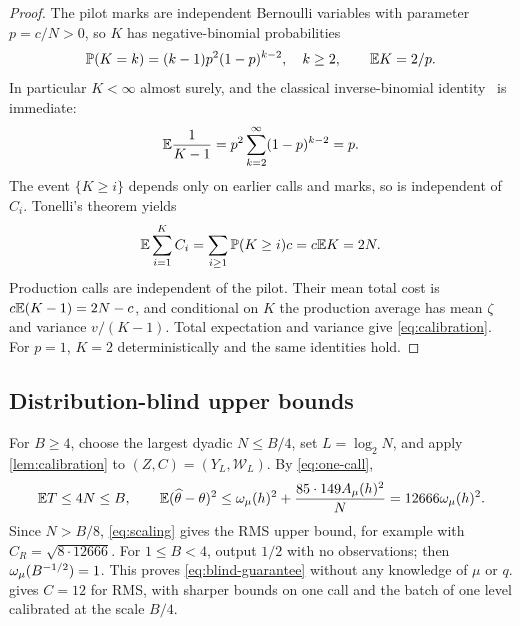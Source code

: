 \begin{proof}
The pilot marks are independent Bernoulli variables with parameter
$p=c/N>0$, so $K$ has negative-binomial probabilities
\[
 \mathbb P(K=k)=(k-1)p^2(1-p)^{k-2},\quad k\ge2,\qquad \mathbb E K=2/p.
\]
In particular $K<\infty$ almost surely, and the classical inverse-binomial
identity~\cite{haldane} is immediate:
\begin{equation}\label{eq:inverse-binomial}
 \mathbb E\frac1{K-1}=p^2\sum_{k=2}^\infty(1-p)^{k-2}=p.
\end{equation}
The event $\{K\ge i\}$ depends only on earlier calls and marks, so is
independent of $C_i$. Tonelli's theorem yields
\[
 \mathbb E\sum_{i=1}^K C_i=\sum_{i\ge1}\mathbb P(K\ge i)c=c\mathbb E K=2N.
\]
Production calls are independent of the pilot. Their mean total cost is
$c\mathbb E(K-1)=2N-c$, and conditional on $K$ the production average has mean
$\zeta$ and variance $v/(K-1)$. Total expectation and variance give
\eqref{eq:calibration}. For $p=1$, $K=2$ deterministically and the same
identities hold.
\end{proof}

\subsection{Distribution-blind upper bounds}
For $B\ge4$, choose the largest dyadic $N\le B/4$, set $L=\log_2N$,
and apply \cref{lem:calibration} to $(Z,C)=(Y_L,\mathcal W_L)$.
By \eqref{eq:one-call},
\begin{equation}\label{eq:blind-MSE}
 \mathbb E T\le4N\le B,\qquad
 \mathbb E(\widehat\theta-\theta)^2
 \le\omega_\mu(h)^2+\frac{85\cdot149A_\mu(h)^2}{N}
 =12666\omega_\mu(h)^2.
\end{equation}
Since $N>B/8$, \eqref{eq:scaling} gives the RMS upper bound, for example
with $C_R=\sqrt{8\cdot12666}$. For $1\le B<4$, output $1/2$ with no
observations; then $\omega_\mu(B^{-1/2})=1$. This proves
\eqref{eq:blind-guarantee} without any knowledge of $\mu$ or $q$.
 gives $C=12$ for RMS, with sharper bounds on one
call and the batch of one level calibrated at the scale $B/4$.

